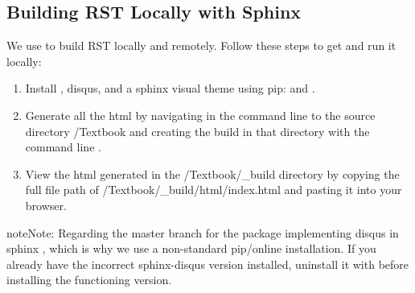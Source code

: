 \documentclass[letterpaper,10pt,english]{sphinxmanual}
\begin{document}
\subsection{Building RST Locally with Sphinx}
\label{\detokenize{Textbook_Creation_Help/rst_intro:building-rst-locally-with-sphinx}}\label{\detokenize{Textbook_Creation_Help/rst_intro:building-rst-locally}}
We use  to build RST locally and remotely. Follow these steps to get  and run it locally:
\begin{enumerate}
\item {} 
Install , disqus, and a sphinx visual theme using pip:  and .

\item {} 
Generate all the html by navigating in the command line to the source directory /Textbook and creating the build in that directory with the command line .

\item {} 
View the html generated in the /Textbook/\_build directory by copying the full file path of /Textbook/\_build/html/index.html and pasting it into your browser.

\end{enumerate}

\begin{sphinxadmonition}{note}{Note:}
Regarding  the master branch for the package implementing disqus in sphinx , which is why we use a non-standard pip/online installation. If you already have the incorrect sphinx-disqus version installed, uninstall it with  before installing the functioning version.
\end{sphinxadmonition}
\end{document}
